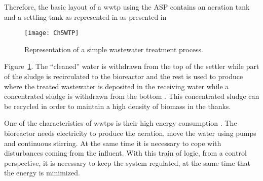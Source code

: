 Therefore, the basic layout of a \gls{wwtp} using the ASP contains an aeration tank and a settling tank as represented in 
as presented in %
%
\begin{figure}[tb]
	\centering
	\texttt{[image: Ch5WTP]}
	\caption{Representation of a simple wastewater treatment process.}
	\label{sec:Ch5WTP}
\end{figure}
%
Figure~\ref{sec:Ch5WTP}. The ``cleaned'' water is withdrawn from the top of the settler while part of the sludge is recirculated to the bioreactor and the rest is used to produce where the treated wastewater is deposited in the receiving water while a concentrated sludge is withdrawn from the bottom \citep{Henze1997}. This concentrated sludge can be recycled in order to maintain a high density of biomass in the thanks.

One of the characteristics of \gls{wwtp}s is their high energy consumption \citep{Longo2016}. The bioreactor needs electricity to produce the aeration, move the water using pumps and continuous stirring. At the same time it is necessary to cope with disturbances coming from the influent. With this train of logic, from a control perspective, it is necessary to keep the system regulated, at the same time that the energy is minimized.

